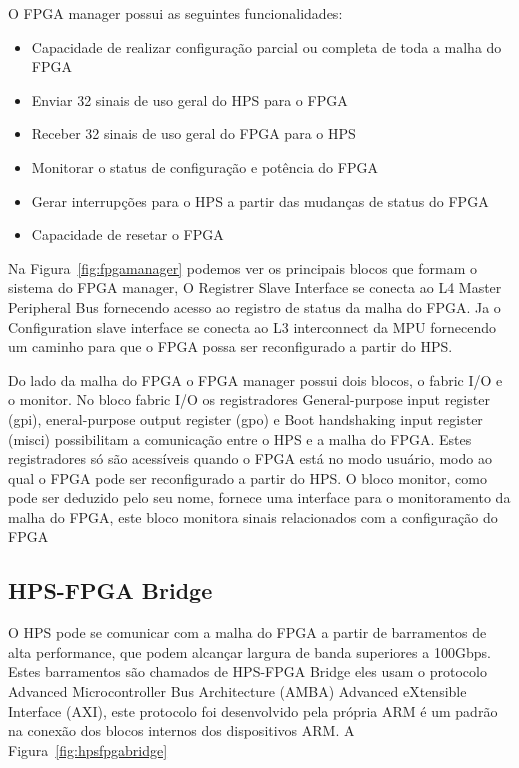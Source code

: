 O FPGA manager possui as seguintes funcionalidades:

\begin{itemize}
    \item Capacidade de realizar configuração parcial ou completa de toda a malha do FPGA
    \item Enviar 32 sinais de uso geral  do HPS para o FPGA
    \item Receber 32 sinais de uso geral do FPGA para o HPS
    \item Monitorar o status de configuração e potência do FPGA
    \item Gerar interrupções para o HPS a partir das mudanças de status do FPGA
    \item Capacidade de resetar o FPGA 
\end{itemize}

Na Figura~\ref{fig:fpgamanager} podemos ver os principais blocos que formam o sistema do FPGA manager, O Registrer Slave Interface se conecta ao L4 Master Peripheral Bus fornecendo acesso ao registro de status da malha do FPGA. Ja o Configuration slave interface se conecta ao L3 interconnect da MPU fornecendo um caminho para que o FPGA possa ser reconfigurado a partir do HPS\@.

Do lado da malha do FPGA o FPGA manager possui dois blocos, o fabric I/O e o monitor. No bloco fabric I/O os registradores General-purpose input register (gpi), eneral-purpose output register (gpo) e Boot handshaking input register (misci) possibilitam a comunicação entre o HPS e a malha do FPGA\@. Estes registradores só são acessíveis quando o FPGA está no modo usuário, modo ao qual o FPGA pode ser reconfigurado a partir do HPS\@. O bloco monitor, como pode ser deduzido pelo seu nome, fornece uma interface para o monitoramento da malha do FPGA, este bloco monitora sinais relacionados com a configuração do FPGA 


\subsection{HPS-FPGA Bridge}
O HPS pode se comunicar com a malha do FPGA a partir de barramentos de alta performance, que podem alcançar largura de banda superiores a 100Gbps. Estes barramentos são chamados de HPS-FPGA Bridge eles usam o protocolo Advanced Microcontroller Bus Architecture (AMBA) Advanced eXtensible Interface (AXI), este protocolo foi desenvolvido pela própria ARM é um padrão na conexão dos blocos internos dos dispositivos ARM\@. A Figura~\ref{fig:hpsfpgabridge}

